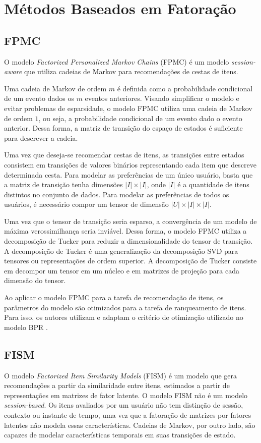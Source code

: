 \section{Métodos Baseados em Fatoração}

\subsection{FPMC}
O modelo \textit{Factorized Personalized Markov Chains} (FPMC) é um modelo \textit{session-aware}
que utiliza cadeias de Markov para recomendações de cestas de itens. \cite{mkv}

Uma cadeia de Markov de ordem $m$ é definida como a probabilidade condicional de
um evento dados os $m$ eventos anteriores. Visando simplificar o modelo e evitar
problemas de esparsidade, o modelo FPMC utiliza uma cadeia de Markov de ordem
$1$, ou seja, a probabilidade condicional de um evento dado o evento anterior.
Dessa forma, a matriz de transição do espaço de estados é suficiente para
descrever a cadeia.

Uma vez que deseja-se recomendar cestas de itens, as transições entre estados
consistem em transições de valores binários representando cada item que descreve
determinada cesta. Para modelar as preferências de um único usuário, basta que a
matriz de transição tenha dimensões $|I| \times |I|$, onde $|I|$ é a quantidade
de itens distintos no conjunto de dados. Para modelar as preferências de todos
os usuários, é necessário compor um tensor de dimensão $|U|
\times |I| \times |I|$.

Uma vez que o tensor de transição seria esparso, a convergência de um modelo de
máxima verossimilhança seria inviável. Dessa forma, o modelo FPMC utiliza a
decomposição de Tucker para reduzir a dimensionalidade do tensor de transição. A
decomposição de Tucker é uma generalização da decomposição SVD para tensores ou
representações de ordem superior. A decomposição de Tucker consiste em decompor
um tensor em um núcleo e em matrizes de projeção para cada dimensão do tensor.

Ao aplicar o modelo FPMC para a tarefa de recomendação de itens, os parâmetros
do modelo são otimizados para a tarefa de ranqueamento de itens. Para isso, os
autores utilizam e adaptam o critério de otimização utilizado no modelo BPR
\cite{rendle2009}.

\subsection{FISM}
O modelo \textit{Factorized Item Similarity Models} (FISM) \cite{kabbur2013fism}
é um modelo que gera recomendações a partir da similaridade entre itens,
estimados a partir de representações em matrizes de fator latente. O modelo FISM
não é um modelo \textit{session-based}. Os itens avaliados por um usuário não
tem distinção de sessão, contexto ou instante de tempo, uma vez que a fatoração
de matrizes por fatores latentes não modela essas características. Cadeias de
Markov, por outro lado, são capazes de modelar características temporais em suas
transições de estado.


